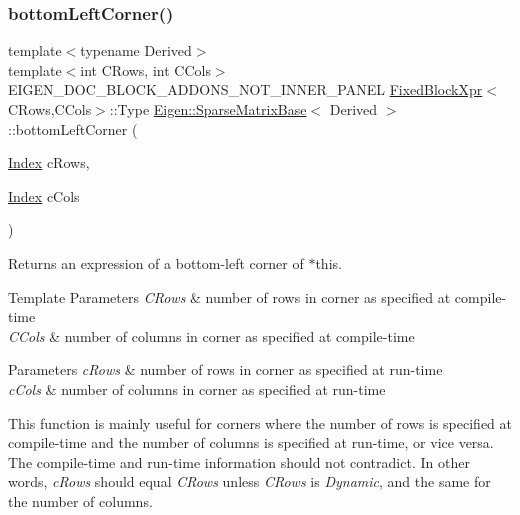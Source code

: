 \subsubsection{\texorpdfstring{bottomLeftCorner()}{bottomLeftCorner()}\hspace{0.1cm}{\footnotesize\ttfamily [3/3]}}
{\footnotesize\ttfamily template$<$typename Derived$>$ \\
template$<$int C\+Rows, int C\+Cols$>$ \\
E\+I\+G\+E\+N\+\_\+\+D\+O\+C\+\_\+\+B\+L\+O\+C\+K\+\_\+\+A\+D\+D\+O\+N\+S\+\_\+\+N\+O\+T\+\_\+\+I\+N\+N\+E\+R\+\_\+\+P\+A\+N\+EL \mbox{\hyperlink{struct_eigen_1_1_sparse_matrix_base_1_1_fixed_block_xpr}{Fixed\+Block\+Xpr}}$<$C\+Rows,C\+Cols$>$\+::Type \mbox{\hyperlink{class_eigen_1_1_sparse_matrix_base}{Eigen\+::\+Sparse\+Matrix\+Base}}$<$ Derived $>$\+::bottom\+Left\+Corner (\begin{DoxyParamCaption}\item[{\mbox{\hyperlink{struct_eigen_1_1_eigen_base_a554f30542cc2316add4b1ea0a492ff02}{Index}}}]{c\+Rows,  }\item[{\mbox{\hyperlink{struct_eigen_1_1_eigen_base_a554f30542cc2316add4b1ea0a492ff02}{Index}}}]{c\+Cols }\end{DoxyParamCaption})\hspace{0.3cm}{\ttfamily [inline]}}

\begin{DoxyReturn}{Returns}
an expression of a bottom-\/left corner of $\ast$this.
\end{DoxyReturn}

\begin{DoxyTemplParams}{Template Parameters}
{\em C\+Rows} & number of rows in corner as specified at compile-\/time \\
\hline
{\em C\+Cols} & number of columns in corner as specified at compile-\/time \\
\hline
\end{DoxyTemplParams}

\begin{DoxyParams}{Parameters}
{\em c\+Rows} & number of rows in corner as specified at run-\/time \\
\hline
{\em c\+Cols} & number of columns in corner as specified at run-\/time\\
\hline
\end{DoxyParams}
This function is mainly useful for corners where the number of rows is specified at compile-\/time and the number of columns is specified at run-\/time, or vice versa. The compile-\/time and run-\/time information should not contradict. In other words, {\itshape c\+Rows} should equal {\itshape C\+Rows} unless {\itshape C\+Rows} is {\itshape Dynamic}, and the same for the number of columns.

